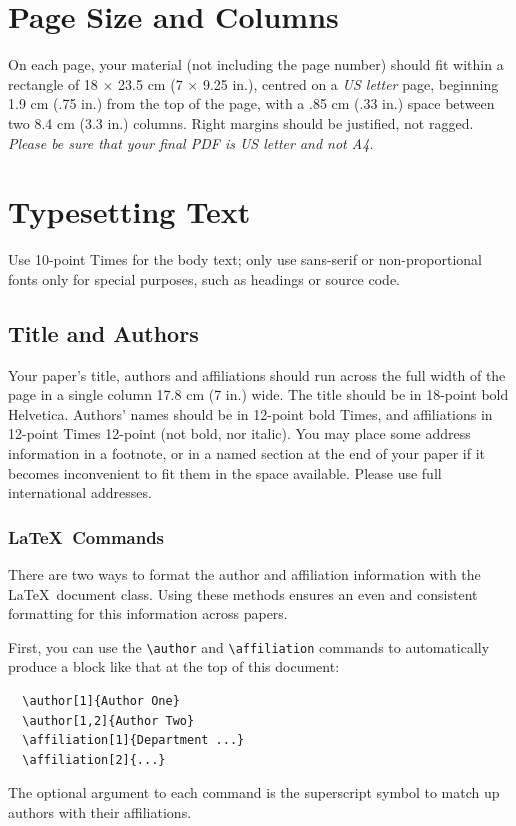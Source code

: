 \documentclass[preprint]{../latex/sigchi-modern}
\begin{document}
\section{Page Size and Columns}
On each page, your material (not including the page number) should fit within a
rectangle of 18 $\times$ 23.5 cm (7 $\times$ 9.25 in.), centred on a \textit{US
letter} page, beginning 1.9 cm (.75 in.) from the top of the page, with a .85 cm
(.33 in.) space between two 8.4 cm (3.3 in.) columns. Right margins should be
justified, not ragged. \textit{Please be sure that your final PDF is US letter
and not A4.}

\section{Typesetting Text}
Use 10-point Times for the body text; only use sans-serif or non-proportional
fonts only for special purposes, such as headings or source code.

\subsection{Title and Authors}
Your paper's title, authors and affiliations should run across the full width of
the page in a single column 17.8 cm (7 in.) wide. The title should be in
18-point bold Helvetica. Authors' names should be in 12-point bold Times, and
affiliations in 12-point Times 12-point (not bold, nor italic).
You may place some address information in a footnote, or in a named section at
the end of your paper if it becomes inconvenient to fit them in the space
available. Please use full international addresses.

\subsubsection{\LaTeX\ Commands}
There are two ways to format the author and affiliation information  with the
\LaTeX\ document class. Using these methods ensures an even and consistent
formatting for this information across papers.

First, you can use the \texttt{\textbackslash author} and 
\texttt{\textbackslash affiliation} commands to automatically produce a block
like that at the top of this document:
\begin{verbatim}
  \author[1]{Author One}
  \author[1,2]{Author Two}
  \affiliation[1]{Department ...}
  \affiliation[2]{...}
\end{verbatim}
The optional argument to each command is the superscript symbol to match up
authors with their affiliations.
\end{document}

